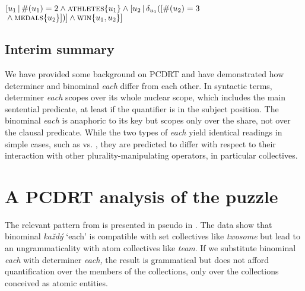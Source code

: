 \documentclass[output=paper,colorlinks,citecolor=brown,newtxmath]{langscibook}
\begin{document}
\ea
\([u_1\,|\,\#(u_1)=2 \wedge \textsc{athletes}\{u_1\} \wedge [u_2\,|\,\delta_{u_1}([\#(u_2)=3\)\\\({}\wedge \textsc{medals}\{u_2\}])] \wedge \textsc{win}\{u_1,u_2\}]\)\label{ex:two-athletes-3-prizes}
\z

\subsection{Interim summary}

We have provided some background on PCDRT and have demonstrated how determiner and binominal \textit{each} differ from each other. In syntactic terms, determiner \textit{each} scopes over its whole nuclear scope, which includes the main sentential predicate, at least if the quantifier is in the subject position. The binominal \textit{each} is anaphoric to its key but scopes only over the share, not over the clausal predicate. While the two types of \textit{each} yield identical readings in simple cases, such as  vs. , they are predicted to differ with respect to their interaction with other plurality-manipulating operators, in particular collectives.


\section{A PCDRT analysis of the puzzle}\label{main-data-puzzle}

\largerpage
The relevant pattern from  is presented in pseudo in . The data show that  binominal \textit{každý} `each' is compatible with set collectives like \textit{twosome} but lead to an ungrammaticality with atom collectives like \textit{team}. If we substitute binominal \textit{each} with determiner \textit{each,} the result is grammatical but does not afford quantification over the members of the collections, only over the collections conceived as atomic entities.

\ea\label{ex:puzzle-psCzech} 
\z\z
\end{document}
